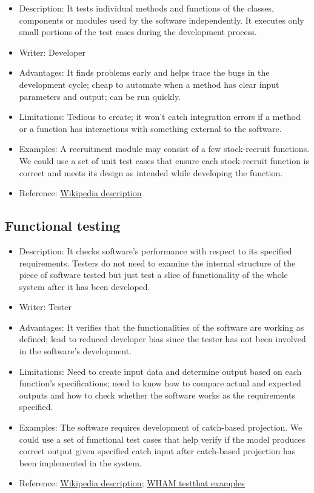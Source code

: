 \documentclass[
]{book}
\begin{document}
\begin{itemize}
\item
  Description: It tests individual methods and functions of the classes, components or modules used by the software independently. It executes only small portions of the test cases during the development process.
\item
  Writer: Developer
\item
  Advantages: It finds problems early and helps trace the bugs in the development cycle; cheap to automate when a method has clear input parameters and output; can be run quickly.
\item
  Limitations: Tedious to create; it won't catch integration errors if a method or a function has interactions with something external to the software.
\item
  Examples: A recruitment module may consist of a few stock-recruit functions. We could use a set of unit test cases that ensure each stock-recruit function is correct and meets its design as intended while developing the function.
\item
  Reference: \href{https://en.wikipedia.org/wiki/Unit_testing}{\underline{Wikipedia description}}
\end{itemize}

\hypertarget{functional-testing}{%
\subsection{Functional testing}\label{functional-testing}}

\begin{itemize}
\item
  Description: It checks software's performance with respect to its specified requirements. Testers do not need to examine the internal structure of the piece of software tested but just test a slice of functionality of the whole system after it has been developed.
\item
  Writer: Tester
\item
  Advantages: It verifies that the functionalities of the software are working as defined; lead to reduced developer bias since the tester has not been involved in the software's development.
\item
  Limitations: Need to create input data and determine output based on each function's specifications; need to know how to compare actual and expected outputs and how to check whether the software works as the requirements specified.
\item
  Examples: The software requires development of catch-based projection. We could use a set of functional test cases that help verify if the model produces correct output given specified catch input after catch-based projection has been implemented in the system.
\item
  Reference: \href{https://en.wikipedia.org/wiki/Functional_testing}{\underline{Wikipedia description}}; \href{https://github.com/timjmiller/wham/tree/master/tests/testthat}{\underline{WHAM testthat examples}}
\end{itemize}
\end{document}
